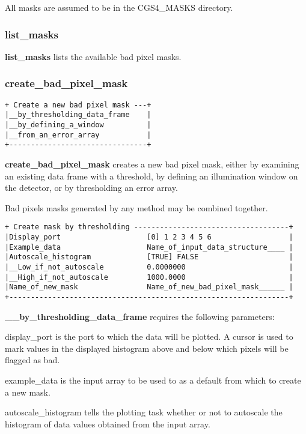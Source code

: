 {All masks are assumed to be in the CGS4\_MASKS directory.

\subsubsection{list\_masks}

{\bf list\_masks} lists the available bad pixel masks.

\subsubsection{create\_bad\_pixel\_mask}
\begin{verbatim}
+ Create a new bad pixel mask ---+
|__by_thresholding_data_frame    |
|__by_defining_a_window          |
|__from_an_error_array           |
+--------------------------------+
\end{verbatim}

{\bf create\_bad\_pixel\_mask} creates a new bad pixel mask, either by 
examining an existing data frame with a threshold, by defining an 
illumination window on the detector, or by thresholding an error array.

Bad pixels masks generated by any method may be combined together.

\begin{verbatim}
+ Create mask by thresholding ------------------------------------+
|Display_port                    [0] 1 2 3 4 5 6                  |
|Example_data                    Name_of_input_data_structure____ |
|Autoscale_histogram             [TRUE] FALSE                     |
|__Low_if_not_autoscale          0.0000000                        |
|__High_if_not_autoscale         1000.0000                        |
|Name_of_new_mask                Name_of_new_bad_pixel_mask______ |
+-----------------------------------------------------------------+
\end{verbatim}
{\bf \_\_by\_thresholding\_data\_frame} requires the following parameters:

{\sf display\_port} is the port to which the data will be plotted.
A cursor is used to mark values in the displayed histogram above and below
which pixels will be flagged as bad.

{\sf example\_data} is the input array to be used to as a default
from which to create a new mask.

{\sf autoscale\_histogram} tells the plotting task whether or not
to autoscale the histogram of data values obtained from the input
array.

}
